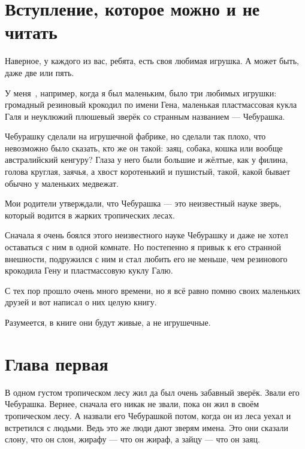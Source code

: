 \section{Вступление, которое можно и не читать}

Наверное, у каждого из вас, ребята, есть своя любимая игрушка. А может быть, даже две или пять.

У меня~\cite{1966:Uspenski:Crocodile-Gena}, например, когда я был маленьким, было три любимых игрушки: громадный резиновый крокодил по имени Гена, маленькая пластмассовая кукла Галя и неуклюжий плюшевый зверёк со странным названием — Чебурашка.

Чебурашку сделали на игрушечной фабрике, но сделали так плохо, что невозможно было сказать, кто же он такой: заяц, собака, кошка или вообще австралийский кенгуру? Глаза у него были большие и жёлтые, как у филина, голова круглая, заячья, а хвост коротенький и пушистый, такой, какой бывает обычно у маленьких медвежат.

Мои родители утверждали, что Чебурашка — это неизвестный науке зверь, который водится в жарких тропических лесах.

Сначала я очень боялся этого неизвестного науке Чебурашку и даже не хотел оставаться с ним в одной комнате. Но постепенно я привык к его странной внешности, подружился с ним и стал любить его не меньше, чем резинового крокодила Гену и пластмассовую куклу Галю.

С тех пор прошло очень много времени, но я всё равно помню своих маленьких друзей и вот написал о них целую книгу.

Разумеется, в книге они будут живые, а не игрушечные.

\section{Глава первая}

В одном густом тропическом лесу жил да был очень забавный зверёк. Звали его Чебурашка. Вернее, сначала его никак не звали, пока он жил в своём тропическом лесу. А назвали его Чебурашкой потом, когда он из леса уехал и встретился с людьми. Ведь это же люди дают зверям имена. Это они сказали слону, что он слон, жирафу — что он жираф, а зайцу — что он заяц.

